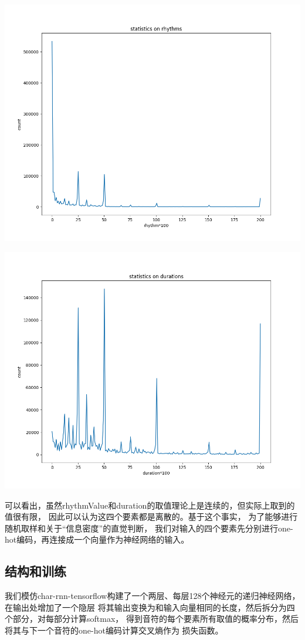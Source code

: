 \documentclass{article}
\begin{document}
    \includegraphics[width=.9\textwidth]{picture/rhythms.png}
    
    \includegraphics[width=.9\textwidth]{picture/durations.png}

    可以看出，虽然rhythmValue和duration的取值理论上是连续的，但实际上取到的值很有限，
    因此可以认为这四个要素都是离散的。基于这个事实，
    为了能够进行随机取样和关于“信息密度”的直觉判断，
    我们对输入的四个要素先分别进行one-hot编码，再连接成一个向量作为神经网络的输入。

  \subsection{结构和训练}
    我们模仿char-rnn-tensorflow构建了一个两层、每层128个神经元的递归神经网络，在输出处增加了一个隐层
    将其输出变换为和输入向量相同的长度，然后拆分为四个部分，对每部分计算softmax，
    得到音符的每个要素所有取值的概率分布，然后将其与下一个音符的one-hot编码计算交叉熵作为
    损失函数。
\end{document}
